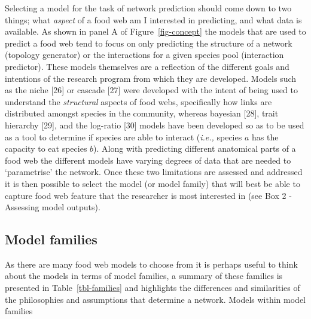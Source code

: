 \documentclass[
]{article}
\begin{document}
Selecting a model for the task of network prediction should come down to
two things; what \emph{aspect} of a food web am I interested in
predicting, and what data is available. As shown in panel A of
Figure~\ref{fig-concept} the models that are used to predict a food web
tend to focus on only predicting the structure of a network (topology
generator) or the interactions for a given species pool (interaction
predictor). These models themselves are a reflection of the different
goals and intentions of the research program from which they are
developed. Models such as the niche {[}26{]} or cascade {[}27{]} were
developed with the intent of being used to understand the
\emph{structural} aspects of food webs, specifically how links are
distributed amongst species in the community, whereas bayesian {[}28{]},
trait hierarchy {[}29{]}, and the log-ratio {[}30{]} models have been
developed so as to be used as a tool to determine if species are able to
interact (\emph{i.e.,} species \(a\) has the capacity to eat species
\(b\)). Along with predicting different anatomical parts of a food web
the different models have varying degrees of data that are needed to
`parametrise' the network. Once these two limitations are assessed and
addressed it is then possible to select the model (or model family) that
will best be able to capture food web feature that the researcher is
most interested in (see Box 2 - Assessing model outputs).

\subsection{Model families}\label{model-families}

As there are many food web models to choose from it is perhaps useful to
think about the models in terms of model families, a summary of these
families is presented in Table~\ref{tbl-families} and highlights the
differences and similarities of the philosophies and assumptions that
determine a network. Models within model families
\end{document}

